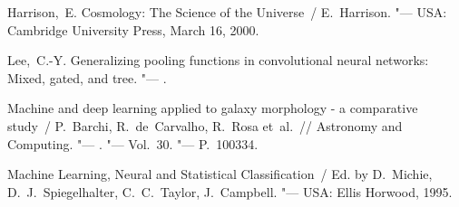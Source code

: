 \documentclass{article} %
\begin{document}




\begin{thebibliography}{1} %
{Harrison,~E.} Cosmology: The Science of the Universe~/ E.~Harrison.
  "---
\newblock USA: Cambridge University Press, March 16, 2000.

{Lee,~C.-Y.} Generalizing pooling functions in convolutional neural
 networks: Mixed, gated, and tree. "---
.

Machine and deep learning applied to galaxy morphology - a comparative study~/
  P.~Barchi, R.~de~Carvalho, R.~Rosa et~al.~// {Astronomy and
  Computing}. "---
. "---
\newblock Vol.~30. "---
\newblock P.~100334.

Machine Learning, Neural and Statistical Classification~/ Ed. by D.~Michie,
  D.~J.~Spiegelhalter, C.~C.~Taylor, J.~Campbell. "---
\newblock USA: Ellis Horwood, 1995.

\end{thebibliography}	
\end{document}
